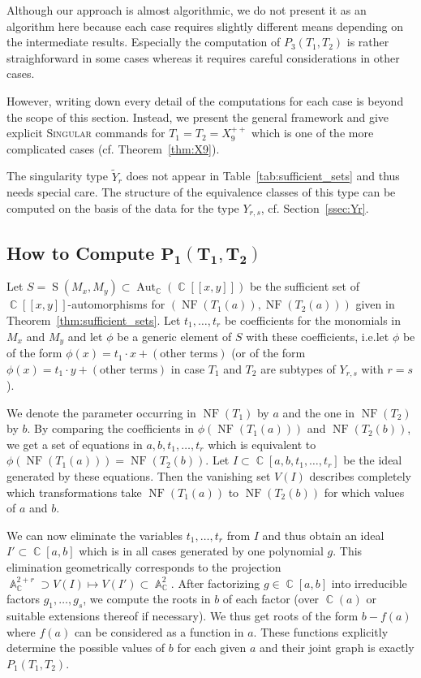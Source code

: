 \documentclass{amsproc}
\theoremstyle{definition}
\newcommand{\Singular}{\textsc{Singular}}
\newcommand{\tY}{\widetilde{Y}}
\DeclareMathOperator{\C}{\mathbb{C}}
\DeclareMathOperator{\A}{\mathbb{A}}
\DeclareMathOperator{\NF}{NF}
\DeclareMathOperator{\s}{S}
\DeclareMathOperator{\Aut}{Aut}
\begin{document}
Although our approach is almost algorithmic, we do not present it as an
algorithm here because each case requires slightly different means depending on
the intermediate results. Especially the computation of $P_3(T_1, T_2)$ is
rather straighforward in some cases whereas it requires careful considerations
in other cases.

However, writing down every detail of the computations for each case is beyond
the scope of this section. Instead, we present the general framework and give
explicit \Singular{} commands for $T_1 = T_2 = X_9^{++}$ which is one of the
more complicated cases (cf. Theorem~\ref{thm:X9}).

The singularity type $\tY_r$ does not appear in Table~\ref{tab:sufficient_sets}
and thus needs special care. The structure of the equivalence classes of this
type can be computed on the basis of the data for the type $Y_{r,s}$, cf.\@
Section~\ref{ssec:Yr}.


\subsection{How to Compute $\boldsymbol{P_1(T_1, T_2)}$}%
\label{ssec:computing_P1}

Let $S = \s(M_x, M_y) \subset \Aut_{\C}(\C[[x,y]])$ be the sufficient set of
$\C[[x,y]]$-automorphisms for $(\NF(T_1(a)), \NF(T_2(a)))$ given in
Theorem~\ref{thm:sufficient_sets}. Let $t_1, \ldots, t_r$ be coefficients for
the monomials in $M_x$ and $M_y$ and let $\phi$ be a generic element of $S$
with these coefficients, i.e.\@ let $\phi$ be of the form
$\phi(x) = t_1 \cdot x + (\text{other terms})$ (or of the form
$\phi(x) = t_1 \cdot y + (\text{other terms})$ in case $T_1$ and $T_2$ are
subtypes of $Y_{r,s}$ with $r = s$).

We denote the parameter occurring in $\NF(T_1)$ by $a$ and the one in
$\NF(T_2)$ by $b$.  By comparing the coefficients in $\phi(\NF(T_1(a)))$ and
$\NF(T_2(b))$, we get a set of equations in $a, b, t_1, \ldots, t_r$ which is
equivalent to $\phi(\NF(T_1(a))) = \NF(T_2(b))$. Let
$I \subset \C[a,b,t_1,\ldots,t_r]$ be the ideal generated by these equations.
Then the vanishing set $V(I)$ describes completely which transformations take
$\NF(T_1(a))$ to $\NF(T_2(b))$ for which values of $a$ and $b$.

We can now eliminate the variables $t_1, \ldots, t_r$ from $I$ and thus obtain
an ideal $I' \subset \C[a,b]$ which is in all cases generated by one polynomial
$g$. This elimination geometrically corresponds to the projection
$\A_{\C}^{2+r} \supset V(I) \mapsto V(I') \subset \A_{\C}^2$. After factorizing
$g \in \C[a,b]$ into irreducible factors $g_1, \ldots, g_s$, we compute the
roots in $b$ of each factor (over $\C(a)$ or suitable extensions thereof if
necessary). We thus get roots of the form $b-f(a)$ where $f(a)$ can be
considered as a function in $a$. These functions explicitly determine the
possible values of $b$ for each given $a$ and their joint graph is exactly
$P_1(T_1, T_2)$.
\end{document}
